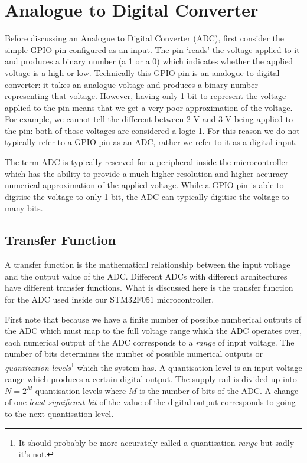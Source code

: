 \chapter{Analogue to Digital Converter}

Before discussing an Analogue to Digital Converter (ADC), first consider the simple GPIO pin configured as an input. 
The pin `reads' the voltage applied to it and produces a binary number (a 1 or a 0) which indicates whether the applied voltage is a high or low. Technically this GPIO pin is an analogue to digital converter: it takes an analogue voltage and produces a binary number representing that voltage. 
However, having only 1 bit to represent the voltage applied to the pin means that we get a very poor approximation of the voltage. 
For example, we cannot tell the different between 2 V and 3 V being applied to the pin: both of those voltages are considered a logic 1. 
For this reason we do not typically refer to a GPIO pin as an ADC, rather we refer to it as a digital input.

The term ADC is typically reserved for a peripheral inside the microcontroller which has the ability to provide a much higher resolution and higher accuracy numerical approximation of the applied voltage. 
While a GPIO pin is able to digitise the voltage to only 1 bit, the ADC can typically digitise the voltage to many bits. 

\section{Transfer Function}
A transfer function is the mathematical relationship between the input voltage and the output value of the ADC.
Different ADCs with different architectures have different transfer functions. What is discussed here is the transfer function for the ADC used inside our STM32F051 microcontroller. 

First note that because we have a finite number of possible numberical outputs of the ADC which must map to the full voltage range which the ADC operates over, each numerical output of the ADC corresponds to a \emph{range} of input voltage. 
The number of bits determines the number of possible numerical outputs or \emph{quantization levels}\footnote{It should probably be more accurately called a quantisation \emph{range} but sadly it's not.} which the system has. A quantisation level is an input voltage range which produces a certain digital output. The supply rail is divided up into \(N = 2^M\) quantisation levels where \(M\) is the number of bits of the ADC. 
A change of one \emph{least significant bit} of the value of the digital output corresponds to going to the next quantisation level. 

